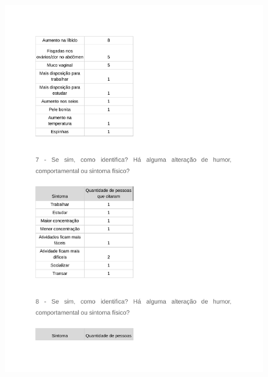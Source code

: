 \begin{apendicesenv}
    \begin{figure}[h]
        \centering
        \includegraphics[keepaspectratio=true,scale=0.7]{figuras/Tab20.pdf}
    \end{figure}
    

\end{apendicesenv}
